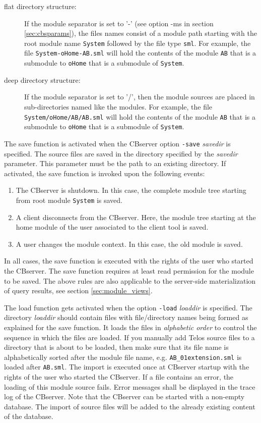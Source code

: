 \begin{description}
\item[flat directory structure:] If the module separator is set to '-' (see option -ms in
section \ref{sec:cbsparams}), the files names consist of a module path
starting with the root module name {\tt System} followed by the file type {\tt sml}.
For example, the file {\tt System-oHome-AB.sml} will hold the contents of
the module {\tt AB} that is a submodule to {\tt oHome} that is a submodule of {\tt System}.
\item[deep directory structure:] If the module separator is set to '/', then the module sources
are placed in sub-directories named like the modules.
For example, the file {\tt System/oHome/AB/AB.sml} will hold the contents of
the module {\tt AB} that is a submodule to {\tt oHome} that is a submodule of {\tt System}.

\end{description}



The save function is activated when the CBserver option {\tt -save} {\it savedir\/} is specified.
The source files are saved in the directory specified by the {\it savedir} parameter.
This parameter must be the path to an existing directory. If activated, the
save function is invoked upon the following events:

\begin{enumerate}
\item The CBserver is shutdown. In this case, the complete module tree starting from
root module {\tt System} is saved.
\item A client disconnects from the CBserver. Here, the module tree starting at the home
module of the user associated to the client tool is saved.
\item A user changes the module context. In this case, the old module is saved.
\end{enumerate}

In all cases, the save function is executed with the
rights of the user who started the CBserver. The save function requires at least read
permission for the module to be saved. The above rules are also applicable to 
the server-side materialization of query results, see section \ref{sec:module_views}.

The load function gets activated when the option {\tt -load} {\it loaddir\/} is specified.
The directory {\it loaddir\/} should contain files with file/directory names being formed
as explained for the save function. It loads the files in {\em alphabetic order} to control
the sequence in which the files are loaded. If you manually add Telos source files
to a directory that is about to be loaded, then make sure that its file name is alphabetically
sorted after the module file name, e.g. {\tt AB\_01extension.sml} is loaded after
{\tt AB.sml}.
The import is executed once at CBserver startup with the rights of the user who
started the CBserver. If a file contains an error, the loading of this module source
fails. Error messages shall be displayed in the trace log of the CBserver. Note
that the CBserver can be started with a non-empty database. The import of source files
will be added to the already existing content of the database.

